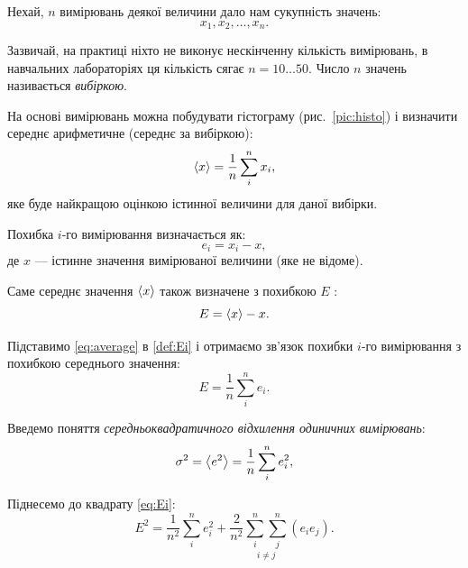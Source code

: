 \documentclass{LabBook}
\begin{document}
  Нехай, $n$ вимірювань деякої величини дало нам сукупність значень:
  \begin{equation}\label{selection}
    x_1, x_2, \ldots, x_n.
  \end{equation}

  Зазвичай, на практиці ніхто не виконує нескінченну кількість вимірювань, в навчальних лабораторіях ця кількість сягає $n = 10 \ldots 50$. Число $n$ значень називається \emph{вибіркою}.

  На основі вимірювань можна побудувати гістограму (рис.~\ref{pic:histo}) і визначити середнє арифметичне (середнє за вибіркою):
  \begin{equation}\label{eq:average}
    \left\langle x \right\rangle = \frac1n \sum\limits_i^n x_i,
  \end{equation}
  яке буде найкращою оцінкою істинної величини для даної вибірки.

  Похибка $i$-го вимірювання визначається як:
  \begin{equation}\label{def:ei}
    e_i = x_i - x,
  \end{equation}
  де $x$ --- істинне значення вимірюваної величини (яке не відоме).

  Саме середнє значення $\left\langle x \right\rangle$ також визначене з похибкою $E$ :
  \begin{equation}\label{def:Ei}
    E = \left\langle x \right\rangle - x.
  \end{equation}

  Підставимо \eqref{eq:average} в \eqref{def:Ei} і отримаємо зв'язок похибки $i$-го вимірювання з похибкою середнього значення:
  \begin{equation}\label{eq:Ei}
    E = \frac1n \sum\limits_i^n e_i.
  \end{equation}


  Введемо поняття \emph{середньоквадратичного відхилення одиничних вимірювань}:
  \begin{equation}
    \sigma^2 = \left\langle e^2 \right\rangle  = \frac1n \sum_i^n e_i^2  , \label{def:sigma}
  \end{equation}

  Піднесемо до квадрату \eqref{eq:Ei}:
  \begin{equation*}
    E^2 = \frac1{n^2} \sum_i^n e_i^2 + \frac2{n^2} \underset{i \neq j}{\sum_{i}^n \sum_{j}^n} (e_i e_j).
  \end{equation*}
\end{document}
